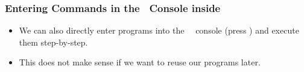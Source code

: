\documentclass[aspectratio=169,mathserif,notheorems]{beamer}%
\begin{document}
\begin{frame}[t]%
\frametitle{Entering Commands in the \python\ Console inside \pycharm}%
%
\begin{itemize}%
\item We can also directly enter programs into the \pycharm\ \python\ console (press \menu{\pycharmConsole}) and execute them step-by-step.%
\item<2-> This does not make sense if we want to reuse our programs later.%
\end{itemize}%
%
%
%

\end{frame}
\end{document}
